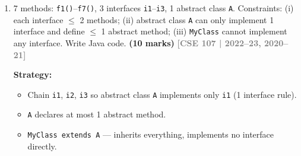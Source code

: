 \documentclass[12pt,a3paper]{article}
\newcommand{\yr}[1]{\hfill\textcolor{gray}{\small\textbf{[#1]}}}
\newcommand{\mk}[1]{\textcolor{orange!70!black}{\small\textbf{(#1 marks)}}}
\begin{document}
\begin{enumerate}
\begin{tcolorbox}
\textbf{Corrected declarations:}

\begin{lstlisting}[language=Java]
interface i1 {
    default void f1() { }   // fixed: body added
    void f2();
    static void f3() { }    // fixed: body added
}
interface i2 {
    void f4();
    private void f5() { }   // fixed: body added (Java 9+)
}
abstract class c1 implements i1 {
    abstract void f6();
    final void f7() { }
}
\end{lstlisting}

\textbf{Minimum code for \texttt{c2}:}

\texttt{c2} must implement: \texttt{f2()} (from \texttt{i1}),
\texttt{f4()} (from \texttt{i2}), and \texttt{f6()} (abstract in \texttt{c1}).

\begin{lstlisting}[language=Java]
class c2 extends c1 implements i2 {
    @Override public void f2() { }
    @Override public void f4() { }
    @Override void f6() { }
}
\end{lstlisting}

\end{tcolorbox}

\item 7 methods: \texttt{f1()}--\texttt{f7()}, 3 interfaces \texttt{i1}--\texttt{i3}, 1 abstract class \texttt{A}. Constraints: (i) each interface $\leq$ 2 methods; (ii) abstract class \texttt{A} can only implement 1 interface and define $\leq$ 1 abstract method; (iii) \texttt{MyClass} cannot implement any interface. Write Java code. \mk{10}
\yr{CSE 107 | 2022--23, 2020--21}

\begin{tcolorbox}[enhanced,breakable,ansbox,
  colback=cD!4,colframe=cD,boxrule=0.8pt,arc=5pt,
  title={\textbf{Answer --- 7 Methods, 3 Interfaces, Abstract Class, No Interface for \texttt{MyClass}}},
  fonttitle=\bfseries\color{white},colbacktitle=cD]

\textbf{Strategy:}
\begin{itemize}[itemsep=2pt]
  \item Chain \texttt{i1}, \texttt{i2}, \texttt{i3} so abstract class
    \texttt{A} implements only \texttt{i1} (1 interface rule).
  \item \texttt{A} declares at most 1 abstract method.
  \item \texttt{MyClass extends A} --- inherits everything, implements
    no interface directly.
\end{itemize}


\end{tcolorbox}
\end{enumerate}
\end{document}

